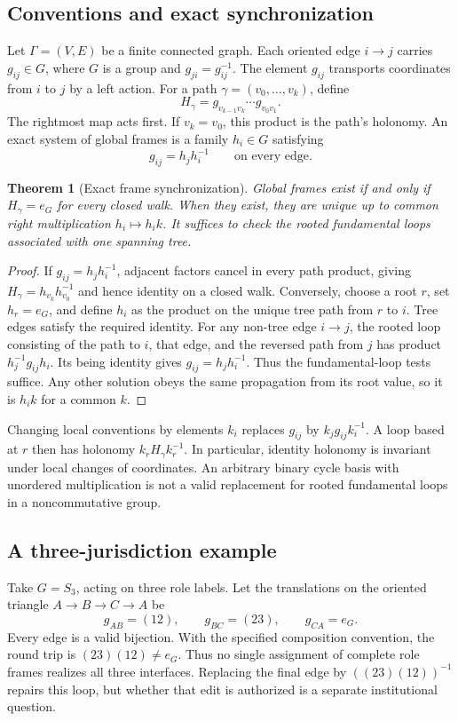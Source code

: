 \documentclass[11pt,letterpaper]{article}
\theoremstyle{plain}
\newtheorem{theorem}[proposition]{Theorem}
\theoremstyle{definition}
\theoremstyle{remark}
\begin{document}
\subsection{Conventions and exact synchronization}
Let $\Gamma=(V,E)$ be a finite connected graph. Each oriented edge $i\to j$ carries $g_{ij}\in G$, where $G$ is a group and $g_{ji}=g_{ij}^{-1}$. The element $g_{ij}$ transports coordinates from $i$ to $j$ by a left action. For a path $\gamma=(v_0,\ldots,v_k)$, define
\[
H_\gamma=g_{v_{k-1}v_k}\cdots g_{v_0v_1}.
\]
The rightmost map acts first. If $v_k=v_0$, this product is the path's holonomy. An exact system of global frames is a family $h_i\in G$ satisfying
\[
g_{ij}=h_jh_i^{-1}\qquad\text{on every edge}.
\]

\begin{theorem}[Exact frame synchronization]\label{thm:holonomy}
Global frames exist if and only if $H_\gamma=e_G$ for every closed walk. When they exist, they are unique up to common right multiplication $h_i\mapsto h_i k$. It suffices to check the rooted fundamental loops associated with one spanning tree.
\end{theorem}
\begin{proof}
If $g_{ij}=h_jh_i^{-1}$, adjacent factors cancel in every path product, giving $H_\gamma=h_{v_k}h_{v_0}^{-1}$ and hence identity on a closed walk. Conversely, choose a root $r$, set $h_r=e_G$, and define $h_i$ as the product on the unique tree path from $r$ to $i$. Tree edges satisfy the required identity. For any non-tree edge $i\to j$, the rooted loop consisting of the path to $i$, that edge, and the reversed path from $j$ has product $h_j^{-1}g_{ij}h_i$. Its being identity gives $g_{ij}=h_jh_i^{-1}$. Thus the fundamental-loop tests suffice. Any other solution obeys the same propagation from its root value, so it is $h_i k$ for a common $k$.
\end{proof}

Changing local conventions by elements $k_i$ replaces $g_{ij}$ by $k_jg_{ij}k_i^{-1}$. A loop based at $r$ then has holonomy $k_rH_\gamma k_r^{-1}$. In particular, identity holonomy is invariant under local changes of coordinates. An arbitrary binary cycle basis with unordered multiplication is not a valid replacement for rooted fundamental loops in a noncommutative group.

\subsection{A three-jurisdiction example}
Take $G=S_3$, acting on three role labels. Let the translations on the oriented triangle $A\to B\to C\to A$ be
\[
g_{AB}=(12),\qquad g_{BC}=(23),\qquad g_{CA}=e_G.
\]
Every edge is a valid bijection. With the specified composition convention, the round trip is $(23)(12)\ne e_G$. Thus no single assignment of complete role frames realizes all three interfaces. Replacing the final edge by $((23)(12))^{-1}$ repairs this loop, but whether that edit is authorized is a separate institutional question.
\end{document}
